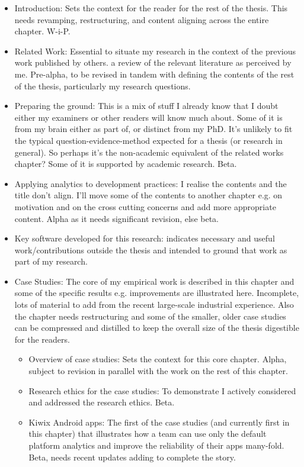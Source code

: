 \begin{itemize}
    \item Introduction: Sets the context for the reader for the rest of the thesis. This needs revamping, restructuring, and content aligning across the entire chapter. W-i-P.
    \item Related Work: Essential to situate my research in the context of the previous work published by others. a review of the relevant literature as perceived by me. Pre-alpha, to be revised in tandem with defining the contents of the rest of the thesis, particularly my research questions.
    \item Preparing the ground: This is a mix of stuff I already know that I doubt either my examiners or other readers will know much about. Some of it is from my brain either as part of, or distinct from my PhD. It's unlikely to fit the typical question-evidence-method expected for a thesis (or research in general). So perhaps it's the non-academic equivalent of the related works chapter? Some of it is supported by academic research. Beta.
    \item Applying analytics to development practices: I realise the contents and the title don't align. I'll move some of the contents to another chapter e.g. on motivation and on the cross cutting concerns and add more appropriate content. Alpha as it needs significant revision, else beta.
    \item Key software developed for this research: indicates necessary and useful work/contributions outside the thesis and intended to ground that work as part of my research.
    \item Case Studies: The core of my empirical work is described in this chapter and some of the specific results e.g. improvements are illustrated here. Incomplete, lots of material to add from the recent large-scale industrial experience. Also the chapter needs restructuring and some of the smaller, older case studies can be compressed and distilled to keep the overall size of the thesis digestible for the readers.
    \begin{itemize}
        \item Overview of case studies: Sets the context for this core chapter. Alpha, subject to revision in parallel with the work on the rest of this chapter.
        \item Research ethics for the case studies: To demonstrate I actively considered and addressed the research ethics. Beta.
        \item Kiwix Android apps: The first of the case studies (and currently first in this chapter) that illustrates how a team can use only the default platform analytics and improve the reliability of their apps many-fold. Beta, needs recent updates adding to complete the story.

\end{itemize}
\end{itemize}
